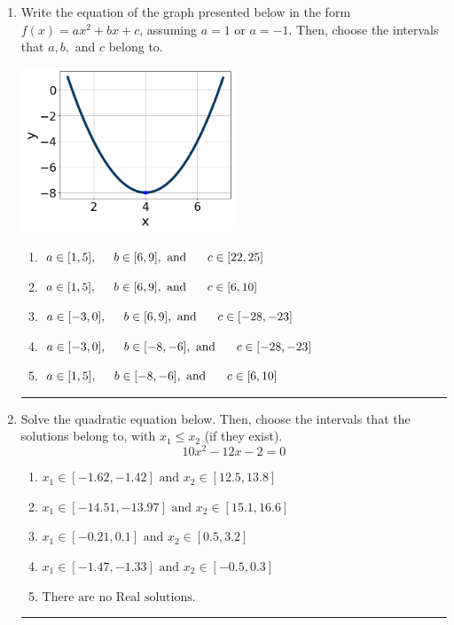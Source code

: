 \documentclass[14pt]{extbook}
\newcommand{\litem}[1]{\item#1\hspace*{-1cm}\rule{\textwidth}{0.4pt}}
\begin{document}
\begin{enumerate}
{\begin{enumerate}[label=\Alph*.]
\end{enumerate} }
\litem{
Write the equation of the graph presented below in the form $f(x)=ax^2+bx+c$, assuming  $a=1$ or $a=-1$. Then, choose the intervals that $a, b,$ and $c$ belong to.
\begin{center}
    \includegraphics[width=0.5\textwidth]{../Figures/quadraticGraphToEquationCopyC.png}
\end{center}
\begin{enumerate}[label=\Alph*.]
\item \( a \in [1, 5], \hspace*{5mm} b \in [6, 9], \text{ and } \hspace*{5mm} c \in [22, 25] \)
\item \( a \in [1, 5], \hspace*{5mm} b \in [6, 9], \text{ and } \hspace*{5mm} c \in [6, 10] \)
\item \( a \in [-3, 0], \hspace*{5mm} b \in [6, 9], \text{ and } \hspace*{5mm} c \in [-28, -23] \)
\item \( a \in [-3, 0], \hspace*{5mm} b \in [-8, -6], \text{ and } \hspace*{5mm} c \in [-28, -23] \)
\item \( a \in [1, 5], \hspace*{5mm} b \in [-8, -6], \text{ and } \hspace*{5mm} c \in [6, 10] \)

\end{enumerate} }
\litem{
Solve the quadratic equation below. Then, choose the intervals that the solutions belong to, with $x_1 \leq x_2$ (if they exist).\[ 10x^{2} -12 x -2 = 0 \]\begin{enumerate}[label=\Alph*.]
\item \( x_1 \in [-1.62, -1.42] \text{ and } x_2 \in [12.5, 13.8] \)
\item \( x_1 \in [-14.51, -13.97] \text{ and } x_2 \in [15.1, 16.6] \)
\item \( x_1 \in [-0.21, 0.1] \text{ and } x_2 \in [0.5, 3.2] \)
\item \( x_1 \in [-1.47, -1.33] \text{ and } x_2 \in [-0.5, 0.3] \)
\item \( \text{There are no Real solutions.} \)


\end{enumerate}}
\end{enumerate}
\end{document}
